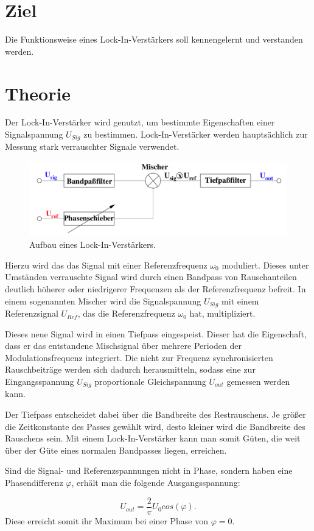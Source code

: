 \section{Ziel}
\label{sec:Ziel}

Die Funktionsweise eines Lock-In-Verstärkers soll kennengelernt und verstanden werden. 

\section{Theorie}
\label{sec:Theorie}

Der Lock-In-Verstärker wird genutzt, um bestimmte Eigenschaften einer Signalspannung 
$U_{Sig}$ zu bestimmen. Lock-In-Verstärker werden hauptsächlich zur Messung stark
verrauschter Signale verwendet.

\begin{figure}
    \centering
    \includegraphics{build/lockin1.png}
    \caption{Aufbau eines Lock-In-Verstärkers.}
\end{figure}

\noindent Hierzu wird das das Signal mit einer Referenzfrequenz $\omega_0$ moduliert.
Dieses unter Umständen verrauschte Signal wird durch einen Bandpass von Rauschanteilen 
deutlich höherer oder niedrigerer Frequenzen als der Referenzfrequenz befreit.
In einem sogenannten Mischer wird die Signalspannung $U_{Sig}$ mit einem Referenzsignal 
$U_{Ref}$, das die Referenzfrequenz $\omega_0$ hat, multipliziert. 

\noindent Dieses neue Signal wird in einen Tiefpass eingespeist. Dieser hat die 
Eigenschaft, dass er das entstandene Mischsignal über mehrere Perioden der 
Modulationsfrequenz integriert.
Die nicht zur Frequenz synchronisierten Rauschbeiträge werden sich dadurch 
herausmitteln, sodass eine zur Eingangsspannung $U_{Sig}$ proportionale Gleichspannung 
$U_{out}$ gemessen werden kann. 

\noindent Der Tiefpass entscheidet dabei über die Bandbreite des Restrauschens. 
Je größer die Zeitkonstante des Passes gewählt wird, desto kleiner wird die Bandbreite 
des Rauschens sein. Mit einem Lock-In-Verstärker kann man somit Güten, 
die weit über der Güte eines normalen Bandpasses liegen, erreichen.

\noindent Sind die Signal- und Referenzspannungen nicht in Phase, sondern haben eine 
Phasendifferenz $\varphi$, erhält man die folgende Ausgangsspannung: 

\begin{equation}
    U_{out} = \frac{2}{\pi} U_0 cos(\varphi).
\end{equation}
Diese erreicht somit ihr Maximum bei einer Phase von $\varphi = 0$. 
